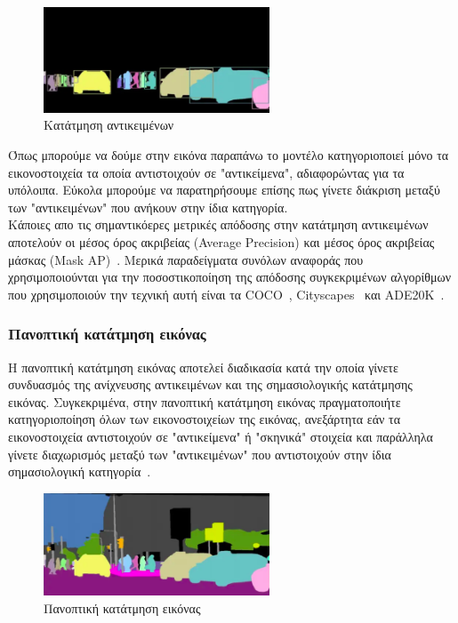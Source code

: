 \documentclass[12pt]{article}
\numberwithin{equation}{section}
\begin{document}
\begin{figure}[h!]
  \centering
  \includegraphics[width=0.6\textwidth]{images/figure2.png} %
  \caption{Κατάτμηση αντικειμένων}
  \label{figure 3}
\end{figure}

Όπως μπορούμε να δούμε στην εικόνα παραπάνω το μοντέλο κατηγοριοποιεί μόνο τα εικονοστοιχεία τα οποία αντιστοιχούν σε "αντικείμενα", αδιαφορώντας για τα υπόλοιπα. Εύκολα μπορούμε να παρατηρήσουμε επίσης πως γίνετε διάκριση μεταξύ των "αντικειμένων" που ανήκουν στην ίδια κατηγορία.\\

Κάποιες απο τις σημαντικόερες μετρικές απόδοσης στην κατάτμηση αντικειμένων αποτελούν οι μέσος όρος ακριβείας (Average Precision) και μέσος όρος ακριβείας μάσκας (Mask AP)~\cite{Hafiz_2020}. Μερικά παραδείγματα συνόλων αναφοράς που χρησιμοποιούνται για την ποσοστικοποίηση της απόδοσης συγκεκριμένων αλγορίθμων που χρησιμοποιούν την τεχνική αυτή είναι τα COCO~\cite{lin2015microsoftcococommonobjects}, Cityscapes~\cite{DBLP:journals/corr/CordtsORREBFRS16} και ADE20K~\cite{8100027}.



\subsubsection{Πανοπτική κατάτμηση εικόνας}

Η πανοπτική κατάτμηση εικόνας αποτελεί διαδικασία κατά την οποία γίνετε συνδυασμός της ανίχνευσης αντικειμένων και της σημασιολογικής κατάτμησης εικόνας. Συγκεκριμένα, στην πανοπτική κατάτμηση εικόνας πραγματοποιήτε κατηγοριοποίηση όλων των εικονοστοιχείων της εικόνας, ανεξάρτητα εάν τα εικονοστοιχεία αντιστοιχούν σε "αντικείμενα" ή "σκηνικά" στοιχεία και παράλληλα γίνετε διαχωρισμός μεταξύ των "αντικειμένων" που αντιστοιχούν στην ίδια σημασιολογική κατηγορία~\cite{elharrouss2021panopticsegmentationreview}.

\newpage

\begin{figure}[h!]
  \centering
  \includegraphics[width=0.6\textwidth]{images/figure3.png} %
  \caption{Πανοπτική κατάτμηση εικόνας}
  \label{figure 4}
\end{figure}
\end{document}

